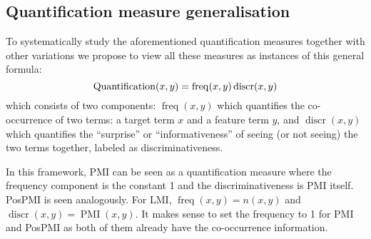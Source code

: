 \subsection{Quantification measure generalisation}
\label{sec:quantification-measures}

To systematically study the aforementioned quantification measures together with other variations we propose to view all these measures as instances of this general formula:
%
\begin{equation}
  \small
  \label{eq:association}
  \operatorname{Quantification}(x,y) = \operatorname{freq}(x, y)
                                       \operatorname{discr}(x, y)
\end{equation}
%
which consists of two components: $\operatorname{freq}(x, y)$ which quantifies the co-occurrence of two terms: a target term $x$ and a feature term $y$, and $\operatorname{discr}(x, y)$ which quantifies the ``surprise'' or ``informativeness'' of seeing (or not seeing) the two terms together,  labeled as discriminativeness.

In this framework, PMI can be seen as a quantification measure where the frequency component is the constant 1 and the discriminativeness is PMI itself. PosPMI is seen analogously. For LMI, $\operatorname{freq}(x, y) = n(x, y)$ and $\operatorname{discr}(x, y) = \operatorname{PMI}(x, y)$. It makes sense to set the frequency to 1 for PMI and PosPMI as both of them already have the co-occurrence information.




